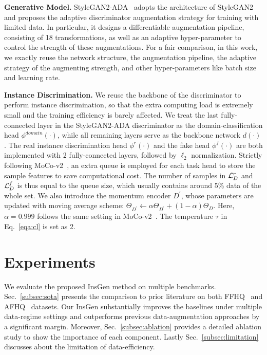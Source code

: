 \documentclass{article}
\begin{document}
\textbf{Generative Model.}
StyleGAN2-ADA~\cite{karras2020training} adopts the architecture of StyleGAN2~\cite{Karras2019stylegan2} and proposes the adaptive discriminator augmentation strategy for training with limited data.
In particular, it designs a differentiable augmentation pipeline, consisting of 18 transformations, as well as an adaptive hyper-parameter to control the strength of these augmentations.
For a fair comparison, in this work, we exactly reuse the network structure, the augmentation pipeline, the adaptive strategy of the augmenting strength, and other hyper-parameters like batch size and learning rate.


\textbf{Instance Discrimination.}
We reuse the backbone of the discriminator to perform instance discrimination, so that the extra computing load is extremely small and the training efficiency is barely affected.
We treat the last fully-connected layer in the StyleGAN2-ADA discriminator as the domain-classification head $\phi^{domain}(\cdot)$, while all remaining layers serve as the backbone network $d(\cdot)$.
The real instance discrimination head $\phi^r(\cdot)$ and the fake head $\phi^f(\cdot)$ are both implemented with 2 fully-connected layers, followed by $\ell_2$ normalization.
Strictly following MoCo-v2~\cite{chen2020mocov2}, an extra queue is employed for each task head to store the sample features to save computational cost.
The number of samples in ${\mathcal{L}}^{r}_{D}$ and ${\mathcal{L}}^{f}_{D}$ is thus equal to the queue size, which usually contains around 5\% data of the whole set.
We also introduce the momentum encoder $D^{\prime}$, whose parameters are updated with moving average scheme: $\Theta_{D^\prime} \gets \alpha \Theta_{D^\prime} + (1 - \alpha) \Theta_D$.
Here, $\alpha=0.999$ follows the same setting in MoCo-v2~\cite{chen2020mocov2}.
The temperature $\tau$ in Eq.~\eqref{eqa:cl} is set as 2.


\section{Experiments}\label{sec:exp}


We evaluate the proposed InsGen method on multiple benchmarks.  Sec.~\ref{subsec:sota} presents the comparison to prior literature on both FFHQ~\cite{karras2019style} and AFHQ~\cite{choi2020starganv2} datasets. Our InsGen substantially improves the baselines under multiple data-regime settings and outperforms previous data-augmentation approaches by a significant margin. Moreover, Sec.~\ref{subsec:ablation} provides a detailed ablation study to show the importance of each component. Lastly Sec.~\ref{subsec:limitation} discusses about the limitation of data-efficiency.
\end{document}
